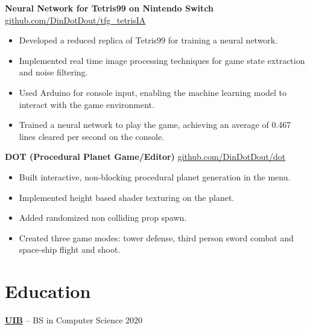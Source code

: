 \documentclass[10pt]{article}       %
\begin{document}
\textbf{Neural Network for Tetris99 on Nintendo Switch} \hfill \href{https://github.com/DinDotDout/tfg_tetrisIA }{github.com/DinDotDout/tfg\_tetrisIA} \\
\vspace{-9pt}
\begin{itemize}
	\item Developed a reduced replica of Tetris99 for training a neural network.
	\item Implemented real time image processing techniques for game state extraction and noise filtering.
	\item Used Arduino for console input, enabling the machine learning model to interact with the game environment.
	\item Trained a neural network to play the game, achieving an average of 0.467 lines cleared per second on the console.
\end{itemize}

\textbf{DOT (Procedural Planet Game/Editor)} \hfill \href{https://github.com/DinDotDout/dot}{github.com/DinDotDout/dot} \\
\vspace{-9pt}
\begin{itemize}
	\item Built interactive, non-blocking procedural planet generation in the menu.
	\item Implemented height based shader texturing on the planet.
	\item Added randomized non colliding prop spawn.
	\item Created three game modes: tower defense, third person sword combat and space-ship flight and shoot.
\end{itemize}

\vspace{-18.5pt}

\section*{Education}
\textbf{\href{https://www.uib.eu/}{UIB}} -- BS in Computer Science \hfill 2020 \\
\end{document}
